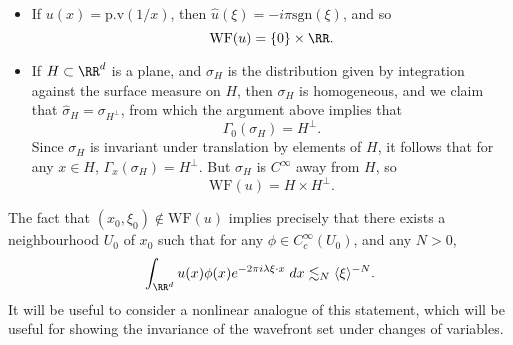 \begin{example}
\begin{itemize}
    \item If $u(x) = \text{p.v}(1/x)$, then $\widehat{u}(\xi) = -i \pi \text{sgn}(\xi)$, and so
    \[ \text{WF}(u) = \{ 0 \} \times \RR. \]

    \item If $H \subset \RR^d$ is a plane, and $\sigma_H$ is the distribution given by integration against the surface measure on $H$, then $\sigma_H$ is homogeneous, and we claim that $\widehat{\sigma}_H = \sigma_{H^\perp}$, from which the argument above implies that
    \[ \Gamma_0(\sigma_H) = H^\perp. \]
    Since $\sigma_H$ is invariant under translation by elements of $H$, it follows that for any $x \in H$, $\Gamma_x(\sigma_H) = H^\perp$. But $\sigma_H$ is $C^\infty$ away from $H$, so
    \[ \text{WF}(u) = H \times H^\perp. \]
  \end{itemize}
\end{example}

The fact that $(x_0,\xi_0) \not \in \text{WF}(u)$ implies precisely that there exists a neighbourhood $U_0$ of $x_0$ such that for any $\phi \in C_c^\infty(U_0)$, and any $N > 0$,
%
\[ \int_{\RR^d} u(x) \phi(x) e^{-2 \pi i \lambda \xi \cdot x}\; dx \lesssim_N \langle \xi \rangle^{-N}. \]
%
It will be useful to consider a nonlinear analogue of this statement, which will be useful for showing the invariance of the wavefront set under changes of variables.

